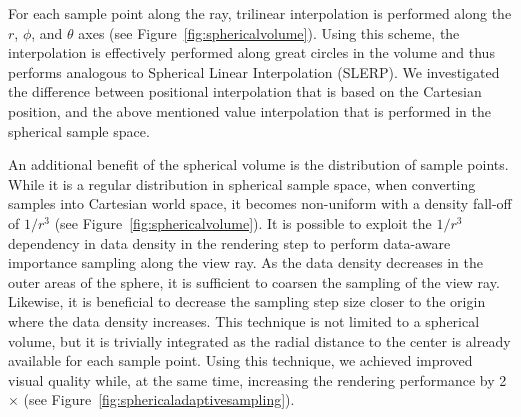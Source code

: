 \documentclass[journal]{vgtc}                %
\begin{document}
 For each sample point along the ray, trilinear interpolation is performed along the $r$, $\phi$, and $\theta$ axes (see Figure~\ref{fig:sphericalvolume}). Using this scheme, the interpolation is effectively performed along great circles in the volume and thus performs analogous to Spherical Linear Interpolation (SLERP). We investigated the difference between positional interpolation that is based on the Cartesian position, and the above mentioned value interpolation that is performed in the spherical sample space.

 An additional benefit of the spherical volume is the distribution of sample points. While it is a regular distribution in spherical sample space, when converting samples into Cartesian world space, it becomes non-uniform with a density fall-off of $1/r^3$ (see Figure~\ref{fig:sphericalvolume}). It is possible to exploit the $1/r^3$ dependency in data density in the rendering step to perform data-aware importance sampling along the view ray. As the data density decreases in the outer areas of the sphere, it is sufficient to coarsen the sampling of the view ray. Likewise, it is beneficial to decrease the sampling step size closer to the origin where the data density increases. This technique is not limited to a spherical volume, but it is trivially integrated as the radial distance to the center is already available for each sample point. Using this technique, we achieved improved visual quality while, at the same time, increasing the rendering performance by 2$\times$ (see Figure~\ref{fig:sphericaladaptivesampling}).
\end{document}
